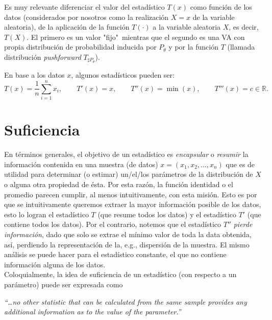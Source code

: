 \begin{remark}
Es muy relevante diferenciar el valor del estadístico $T(x)$ como función de los datos (considerados por nosotros como la realización $X=x$ de la variable aleatoria), de la aplicación de la función $T(\cdot)$ a la variable aleatoria $X$, es decir, $T(X)$. El primero es un valor "fijo"\ mientras que el segundo es una VA con propia distribución de probabilidad inducida por $P_\theta$ y por la función $T$ (llamada distribución \emph{pushforward} $T_{\sharp P_\theta}$).\\ 
\end{remark}


En base a los datos $x$, algunos estadísticos pueden ser: 
\begin{equation}
\nonumber
	T(x) = \frac{1}{n}\sum_{i=1}^nx_i,\qquad T'(x) = x, \qquad T''(x) = \min(x), \qquad T'''(x) = c\in \mathbb{R}.
\end{equation}

\section{Suficiencia}
En términos generales, el objetivo de un estadístico es \textit{encapsular} o \textit{resumir} la información contenida en una muestra (de datos) $x = (x_1,x_2,\ldots,x_n)$ que es de utilidad para determinar (o estimar) un/el/los parámetros de la distribución de $X$ o alguna otra propiedad de ésta. Por esta razón, la función identidad o el promedio parecen cumplir, al menos intuitivamente, con esta misión. Esto es por que se intuitivamente queremos extraer la mayor información posible de los datos, esto lo logran el estadístico $T$ (que resume todos los datos) y el estadístico $T'$ (que contiene todos los datos). Por el contrario, notemos que el estadístico $T''$ \emph{pierde información}, dado que solo se extrae el mínimo valor de toda la data obtenida, así, perdiendo la representación de la, e.g., dispersión de la muestra. El mismo análisis se puede hacer para el estadístico constante, el que no contiene  información alguna de los datos.\\

Coloquialmente, la idea de suficiencia de un estadístico (con respecto a un parámetro) puede ser expresada como  
\begin{displayquote} \it
“…no other statistic that can be calculated from the same sample provides any additional information as to the value of the parameter.”
\end{displayquote}

